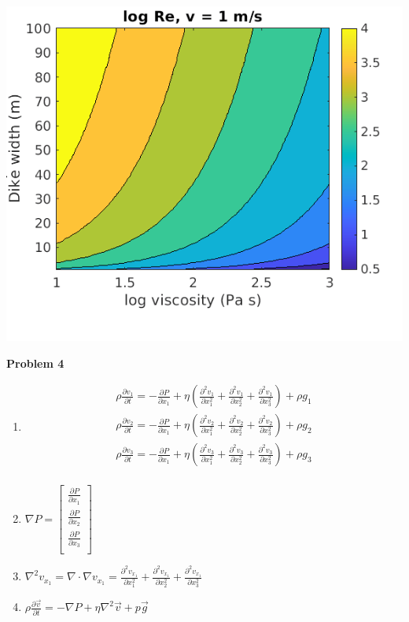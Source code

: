 \documentclass{article}
\begin{document}
\includegraphics[scale=.5]{v1.png}

\newpage

\noindent\textbf{Problem 4}
\begin{enumerate}
\item\begin{gather*}
  \rho \frac{\partial v_1}{\partial t} = - \frac{\partial P}{\partial x_1} + \eta \left(\frac{\partial^2 v_1}{\partial x_1 ^ 2} + \frac{\partial^2 v_1}{\partial x_2 ^ 2} + \frac{\partial^2 v_1}{\partial x_3 ^ 2}\right) + \rho g_1\\
  \rho \frac{\partial v_2}{\partial t} = - \frac{\partial P}{\partial x_1} + \eta \left(\frac{\partial^2 v_2}{\partial x_1 ^ 2} + \frac{\partial^2 v_2}{\partial x_2 ^ 2} + \frac{\partial^2 v_2}{\partial x_3 ^ 2}\right) + \rho g_2\\
    \rho \frac{\partial v_3}{\partial t} = - \frac{\partial P}{\partial x_1} + \eta \left(\frac{\partial^2 v_3}{\partial x_1 ^ 2} + \frac{\partial^2 v_3}{\partial x_2 ^ 2} + \frac{\partial^2 v_3}{\partial x_3 ^ 2}\right) + \rho g_3\\
\end{gather*}
\item
  $\nabla P = \begin{bmatrix}
  \frac{\partial P}{\partial x_1}\\
  \frac{\partial P}{\partial x_2}\\
  \frac{\partial P}{\partial x_3}\\
  \end{bmatrix}$\\
\item$\nabla^2 v_{x_1} = \nabla\cdot\nabla v_{x_1} =\frac{\partial^2 v_{x_1}}{\partial x_1 ^2} +  \frac{\partial^2 v_{x_1}}{\partial x_2 ^2} +  \frac{\partial^2 v_{x_1}}{\partial x_3 ^2}$

\item $\rho \frac{\partial\vec{v}}{\partial t} = - \nabla P + \eta \nabla^2 \vec{v} + p\vec{g}$

  
\end{enumerate}
\end{document}
